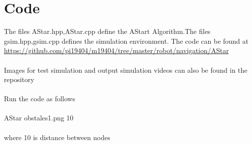 \documentclass[fontsize=12pt, %
                             paper=a4, %
                             oneside, %
                             captions=tableheading,
                             index=totoc,
                             hyperref]{labbook}
\begin{document}
\section{Code}
The files AStar.hpp,AStar.cpp define the AStart Algorithm.The files gsim.hpp,gsim.cpp
defines the simulation environment.
The code can be found at \url{https://github.com/pi19404/m19404/tree/master/robot/navigation/AStar}
\\\\
Images for test simulation and output simulation videos can also be found in the repository
\\\\
Run the code as follows \\\\
AStar obstales1.png 10  \\\\
where 10 is distance between nodes
\\\\
\end{document}

